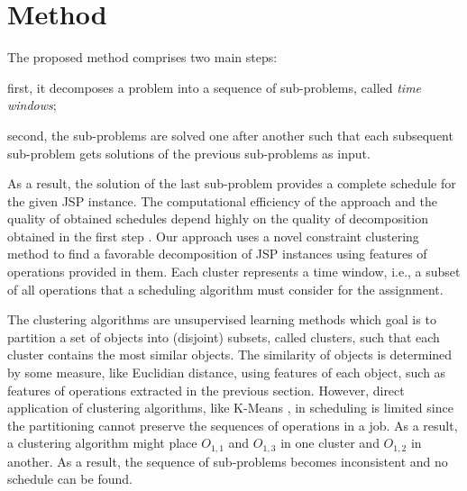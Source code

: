 \documentclass[runningheads]{llncs}
\begin{document}
\section{Method}
\label{sec:method}
The proposed method comprises two main steps: 
\begin{enumerate*}[label=\emph{(\roman*)}]
  \item first, it decomposes a problem into a sequence of sub-problems, called \emph{time windows}; 
  \item second, the sub-problems are solved one after another such that each subsequent sub-problem gets solutions of the previous sub-problems as input.
\end{enumerate*}
As a result, the solution of the last sub-problem provides a complete schedule for the given JSP instance.
The computational efficiency of the approach and the quality of obtained schedules depend highly on the quality of decomposition obtained in the first step \cite{zhang2010hybrid,zhai2014decomposition}. 
Our approach uses a novel constraint clustering method to find a favorable decomposition of JSP instances using features of operations provided in them. Each cluster represents a time window, i.e., a subset of all operations that a scheduling algorithm must consider for the assignment.

The clustering algorithms are unsupervised learning methods which goal is to partition a set of objects into (disjoint) subsets, called clusters, such that each cluster contains the most similar objects. 
The similarity of objects is determined by some measure, like Euclidian distance, using features of each object, such as features of operations extracted in the previous section. 
However, direct application of clustering algorithms, like K-Means \cite{Forgy1965ClusterAO}, in scheduling is limited since the partitioning cannot preserve the sequences of operations in a job. As a result, a clustering algorithm might place $O_{1,1}$ and $O_{1,3}$ in one cluster and $O_{1,2}$ in another. As a result, the sequence of sub-problems becomes inconsistent and no schedule can be found. 
\end{document}
